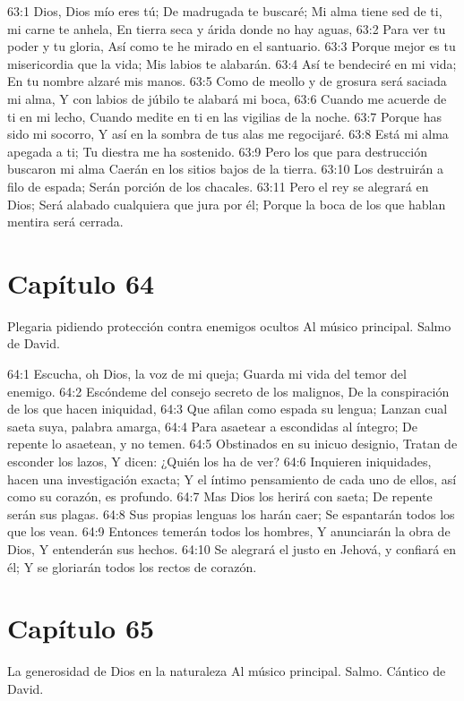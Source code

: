 63:1 Dios, Dios mío eres tú; 
De madrugada te buscaré; 
Mi alma tiene sed de ti, mi carne te anhela, 
En tierra seca y árida donde no hay aguas, 
63:2 Para ver tu poder y tu gloria, 
Así como te he mirado en el santuario. 
63:3 Porque mejor es tu misericordia que la vida; 
Mis labios te alabarán. 
63:4 Así te bendeciré en mi vida; 
En tu nombre alzaré mis manos. 
63:5 Como de meollo y de grosura será saciada mi alma, 
Y con labios de júbilo te alabará mi boca, 
63:6 Cuando me acuerde de ti en mi lecho, 
Cuando medite en ti en las vigilias de la noche. 
63:7 Porque has sido mi socorro, 
Y así en la sombra de tus alas me regocijaré. 
63:8 Está mi alma apegada a ti; 
Tu diestra me ha sostenido. 
63:9 Pero los que para destrucción buscaron mi alma 
Caerán en los sitios bajos de la tierra. 
63:10 Los destruirán a filo de espada; 
Serán porción de los chacales. 
63:11 Pero el rey se alegrará en Dios; 
Será alabado cualquiera que jura por él; 
Porque la boca de los que hablan mentira será cerrada. 
\section*{Capítulo 64}
Plegaria pidiendo protección contra enemigos ocultos 
Al músico principal. Salmo de David. 
 
64:1 Escucha, oh Dios, la voz de mi queja; 
Guarda mi vida del temor del enemigo. 
64:2 Escóndeme del consejo secreto de los malignos, 
De la conspiración de los que hacen iniquidad, 
64:3 Que afilan como espada su lengua; 
Lanzan cual saeta suya, palabra amarga, 
64:4 Para asaetear a escondidas al íntegro; 
De repente lo asaetean, y no temen. 
64:5 Obstinados en su inicuo designio, 
Tratan de esconder los lazos, 
Y dicen: ¿Quién los ha de ver? 
64:6 Inquieren iniquidades, hacen una investigación exacta; 
Y el íntimo pensamiento de cada uno de ellos, así como su corazón, es profundo. 
64:7 Mas Dios los herirá con saeta; 
De repente serán sus plagas. 
64:8 Sus propias lenguas los harán caer; 
Se espantarán todos los que los vean. 
64:9 Entonces temerán todos los hombres, 
Y anunciarán la obra de Dios, 
Y entenderán sus hechos. 
64:10 Se alegrará el justo en Jehová, y confiará en él; 
Y se gloriarán todos los rectos de corazón. 
\section*{Capítulo 65}
La generosidad de Dios en la naturaleza 
Al músico principal. Salmo. Cántico de David. 
 

